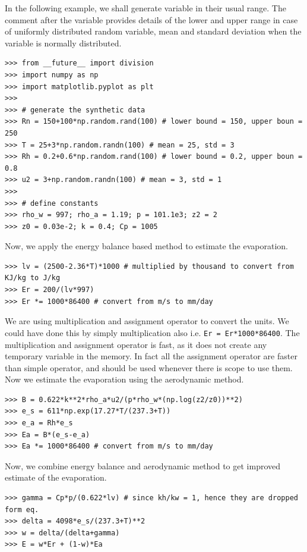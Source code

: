 \documentclass[10pt]{book}
\begin{document}
{In the following example, we shall generate variable in their usual range. The comment after the variable provides details of the lower and upper range in case of uniformly distributed random variable, mean and standard deviation when the variable is normally distributed. 

\beforeverb \begin{verbatim}
>>> from __future__ import division
>>> import numpy as np
>>> import matplotlib.pyplot as plt
>>> 
>>> # generate the synthetic data
>>> Rn = 150+100*np.random.rand(100) # lower bound = 150, upper boun = 250
>>> T = 25+3*np.random.randn(100) # mean = 25, std = 3
>>> Rh = 0.2+0.6*np.random.rand(100) # lower bound = 0.2, upper boun = 0.8
>>> u2 = 3+np.random.randn(100) # mean = 3, std = 1
>>> 
>>> # define constants
>>> rho_w = 997; rho_a = 1.19; p = 101.1e3; z2 = 2
>>> z0 = 0.03e-2; k = 0.4; Cp = 1005
\end{verbatim} \afterverb

Now, we apply the energy balance based method to estimate the evaporation. 
\beforeverb \begin{verbatim}
>>> lv = (2500-2.36*T)*1000 # multiplied by thousand to convert from KJ/kg to J/kg
>>> Er = 200/(lv*997)
>>> Er *= 1000*86400 # convert from m/s to mm/day
\end{verbatim} \afterverb
We are using multiplication and assignment operator to convert the units. We could have done this by simply multiplication also i.e. \verb"Er = Er*1000*86400". The multiplication and assignment operator is fast, as it does not create any temporary variable in the memory. In fact all the assignment operator are faster than simple operator, and should be used whenever there is scope to use them. Now we estimate the evaporation using the aerodynamic method.
\beforeverb \begin{verbatim}
>>> B = 0.622*k**2*rho_a*u2/(p*rho_w*(np.log(z2/z0))**2)
>>> e_s = 611*np.exp(17.27*T/(237.3+T))
>>> e_a = Rh*e_s
>>> Ea = B*(e_s-e_a)
>>> Ea *= 1000*86400 # convert from m/s to mm/day
\end{verbatim} \afterverb
Now, we combine energy balance and aerodynamic method to get improved estimate of the evaporation.
\beforeverb \begin{verbatim}
>>> gamma = Cp*p/(0.622*lv) # since kh/kw = 1, hence they are dropped form eq.
>>> delta = 4098*e_s/(237.3+T)**2
>>> w = delta/(delta+gamma)
>>> E = w*Er + (1-w)*Ea
\end{verbatim} \afterverb

}
\end{document}
